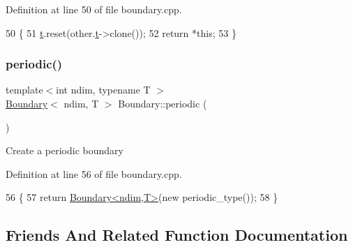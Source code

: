 Definition at line 50 of file boundary.\+cpp.


\begin{DoxyCode}
50                                                                            \{
51     \hyperlink{classshark_1_1ndim_1_1_boundary_a16fdfa33d88480b4127ff36c1f1a2ce7}{t}.reset(other.\hyperlink{classshark_1_1ndim_1_1_boundary_a16fdfa33d88480b4127ff36c1f1a2ce7}{t}->clone());
52     \textcolor{keywordflow}{return} *\textcolor{keyword}{this};
53 \}
\end{DoxyCode}
\hypertarget{classshark_1_1ndim_1_1_boundary_af999765d8c5dccc13a4e8e224f966fc5}{}\label{classshark_1_1ndim_1_1_boundary_af999765d8c5dccc13a4e8e224f966fc5} 
\subsubsection{\texorpdfstring{periodic()}{periodic()}}
{\footnotesize\ttfamily template$<$int ndim, typename T $>$ \\
\hyperlink{classshark_1_1ndim_1_1_boundary}{Boundary}$<$ ndim, T $>$ Boundary\+::periodic (\begin{DoxyParamCaption}{ }\end{DoxyParamCaption})\hspace{0.3cm}{\ttfamily [static]}}

Create a periodic boundary 

Definition at line 56 of file boundary.\+cpp.


\begin{DoxyCode}
56                                             \{
57     \textcolor{keywordflow}{return} \hyperlink{classshark_1_1ndim_1_1_boundary}{Boundary<ndim,T>}(\textcolor{keyword}{new} periodic\_type());
58 \}
\end{DoxyCode}


\subsection{Friends And Related Function Documentation}
\hypertarget{classshark_1_1ndim_1_1_boundary_ae56b9154646ac1569c81ea1215860995}{}\label{classshark_1_1ndim_1_1_boundary_ae56b9154646ac1569c81ea1215860995} 
